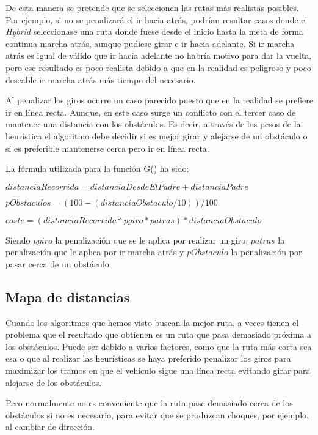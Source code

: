 De esta manera se pretende que se seleccionen las rutas más realistas posibles. Por ejemplo, si no se penalizará el ir hacia atrás, podrían resultar casos donde el \textit{Hybrid \Astar} seleccionase una ruta donde fuese desde el inicio hasta la meta de forma continua marcha atrás, aunque pudiese girar e ir hacia adelante. Si ir marcha atrás es igual de válido que ir hacia adelante no habría motivo para dar la vuelta, pero ese resultado es poco realista debido a que en la realidad es peligroso y poco deseable ir marcha atrás más tiempo del necesario.

Al penalizar los giros ocurre un caso parecido puesto que en la realidad se prefiere ir en línea recta. Aunque, en este caso surge un conflicto con el tercer caso de mantener una distancia con los obstáculos. Es decir, a través de los pesos de la heurística el algoritmo debe decidir si es mejor girar y alejarse de un obstáculo o si es preferible mantenerse cerca pero ir en línea recta.

La fórmula utilizada para la función G() ha sido:
\begin{center}
$distanciaRecorrida = distanciaDesdeElPadre + distanciaPadre$

$pObstaculos = (100-(distanciaObstaculo/10))/100$

$coste = (distanciaRecorrida * pgiro * patras) * distanciaObstaculo$
\end{center}

Siendo $pgiro$ la penalización que se le aplica por realizar un giro, $patras$ la penalización que le aplica por ir marcha atrás y $pObstaculo$ la penalización por pasar cerca de un obstáculo.

\subsection{Mapa de distancias} \label{mapadistancias}
Cuando los algoritmos que hemos visto buscan la mejor ruta, a veces tienen el problema que el resultado que obtienen es un ruta que pasa demasiado próxima a los obstáculos. Puede ser debido a varios factores, como que la ruta más corta sea esa o que al realizar las heurísticas se haya preferido penalizar los giros para maximizar los tramos en que el vehículo sigue una línea recta evitando girar para alejarse de los obstáculos.

Pero normalmente no es conveniente que la ruta pase demasiado cerca de los obstáculos si no es necesario, para evitar que se produzcan choques, por ejemplo, al cambiar de dirección.

